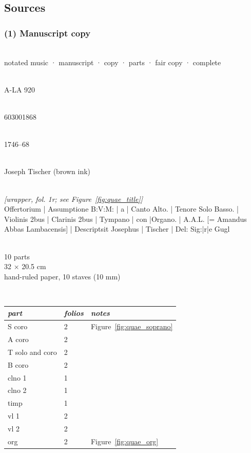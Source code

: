 \documentclass[abbrwidth=7em,shorttitlesize=55]{ees}
\begin{document}
\subsection{Sources}

\subsubsection{(1) Manuscript copy}

\\
notated music · manuscript · copy · parts · fair copy · complete

\\
A-LA 920

\\
603001868

\\
1746–68

\\
Joseph Tischer (brown ink)

\\
\textit{[wrapper, fol. 1r; see Figure~\ref{fig:quae_title}]}\\
Offertorium | Assumptione B:V:M: | a | Canto Alto. | Tenore Solo Basso. | Violinis 2bus | Clarinis 2bus | Tympano | con |Organo. | A.A.L. [= Amandus Abbas Lambacensis] | Descriptsit Josephus | Tischer | Del: Sig:|r|e Gugl

\\
10 parts\\
32 × 20.5 cm\\
hand-ruled paper, 10 staves (10 mm)

\\[1ex]
\begin{tabular}{lll}
  \toprule
  \itshape part & \itshape folios & \itshape notes \\
  \midrule
  S coro & 2 & Figure~\ref{fig:quae_soprano}\\
  A coro & 2 \\
  T solo and coro & 2 \\
  B coro & 2 \\
  clno 1 & 1 \\
  clno 2 & 1 \\
  timp & 1 \\
  vl 1 & 2 \\
  vl 2 & 2 \\
  org & 2 & Figure~\ref{fig:quae_org} \\
  \bottomrule
\end{tabular}
\end{document}
